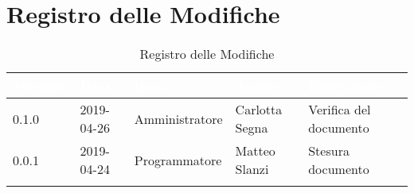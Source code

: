 \newpage

\section*{Registro delle Modifiche}

\begin{center}
\begin{longtable}[c]{|m{}|m{}|m{}|m{}|p{}|}
\hline
\rowcolor{bluelogo}\textbf{\textcolor{white}{Versione}} & \textbf{\textcolor{white}{Data}} & \textbf{\textcolor{white}{Ruolo}} & \textbf{\textcolor{white}{Autore}} & \textbf{\textcolor{white}{Descrizione}}\\
\hline \hline
\endfirsthead
\rowcolor{grigio} 0.1.0 & 2019-04-26 & Amministratore & Carlotta Segna & Verifica del documento \\
\hline
0.0.1 & 2019-04-24 & Programmatore & Matteo Slanzi & Stesura documento \\
\hline
\caption{Registro delle Modifiche}
\end{longtable}
\end{center}
